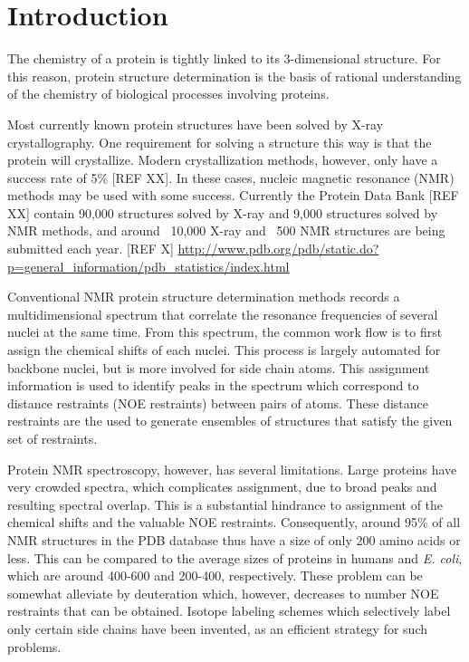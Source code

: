 \chapter{Introduction}

The chemistry of a protein is tightly linked to its 3-dimensional structure.
For this reason, protein structure determination is the basis of rational understanding of the chemistry of biological processes involving proteins.

Most currently known protein structures have been solved by X-ray crystallography.
One requirement for solving a structure this way is that the protein will crystallize.
Modern crystallization methods, however, only have a success rate of 5\% [REF XX].
In these cases, nucleic magnetic resonance (NMR) methods may be used with some success.
Currently the Protein Data Bank [REF XX] contain 90,000 structures solved by X-ray and 9,000 structures solved by NMR methods, and around ~10,000 X-ray and ~500 NMR structures are being submitted each year. [REF X]
\url{http://www.pdb.org/pdb/static.do?p=general_information/pdb_statistics/index.html}

Conventional NMR protein structure determination methods records a multidimensional spectrum that correlate the resonance frequencies of several nuclei at the same time.
From this spectrum, the common work flow is to first assign the chemical shifts of each nuclei.
This process is largely automated for backbone nuclei, but is more involved for side chain atoms.
This assignment information is used to identify peaks in the spectrum which correspond to distance restraints (NOE restraints) between pairs of atoms.
These distance restraints are the used to generate ensembles of structures that satisfy the given set of restraints.

Protein NMR spectroscopy, however, has several limitations.
Large proteins have very crowded spectra, which complicates assignment, due to broad peaks and resulting spectral overlap.
This is a substantial hindrance to assignment of the chemical shifts and the valuable NOE restraints.
Consequently, around 95\% of all NMR structures in the PDB database thus have a size of only 200 amino acids or less.
This can be compared to the average sizes of proteins in humans and \textit{E. coli}, which are around 400-600 and 200-400, respectively.
These problem can be somewhat alleviate by deuteration which, however, decreases to number NOE restraints that can be obtained.
Isotope labeling schemes which selectively label only certain side chains have been invented, as an efficient strategy for such problems.

